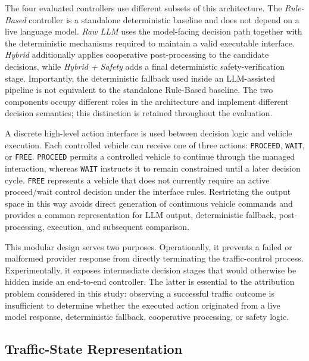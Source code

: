 \documentclass[letterpaper,10pt,conference]{ieeeconf}
\begin{document}
The four evaluated controllers use different subsets of this architecture. The \emph{Rule-Based} controller is a standalone deterministic baseline and does not depend on a live language model. \emph{Raw LLM} uses the model-facing decision path together with the deterministic mechanisms required to maintain a valid executable interface. \emph{Hybrid} additionally applies cooperative post-processing to the candidate decisions, while \emph{Hybrid + Safety} adds a final deterministic safety-verification stage. Importantly, the deterministic fallback used inside an LLM-assisted pipeline is not equivalent to the standalone Rule-Based baseline. The two components occupy different roles in the architecture and implement different decision semantics; this distinction is retained throughout the evaluation.



A discrete high-level action interface is used between decision logic and vehicle execution. Each controlled vehicle can receive one of three actions: \texttt{PROCEED}, \texttt{WAIT}, or \texttt{FREE}. \texttt{PROCEED} permits a controlled vehicle to continue through the managed interaction, whereas \texttt{WAIT} instructs it to remain constrained until a later decision cycle. \texttt{FREE} represents a vehicle that does not currently require an active proceed/wait control decision under the interface rules. Restricting the output space in this way avoids direct generation of continuous vehicle commands and provides a common representation for LLM output, deterministic fallback, post-processing, execution, and subsequent comparison.



This modular design serves two purposes. Operationally, it prevents a failed or malformed provider response from directly terminating the traffic-control process. Experimentally, it exposes intermediate decision stages that would otherwise be hidden inside an end-to-end controller. The latter is essential to the attribution problem considered in this study: observing a successful traffic outcome is insufficient to determine whether the executed action originated from a live model response, deterministic fallback, cooperative processing, or safety logic.



\subsection{Traffic-State Representation}
\end{document}
